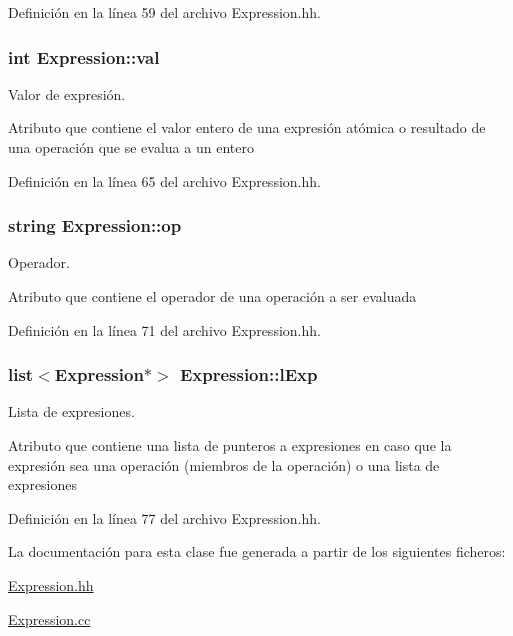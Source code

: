 Definición en la línea 59 del archivo Expression.\+hh.

\subsubsection[{\texorpdfstring{val}{val}}]{\setlength{\rightskip}{0pt plus 5cm}int Expression\+::val\hspace{0.3cm}{\ttfamily [private]}}\hypertarget{class_expression_a9c15b529b5d59e6bffb3855e384c04aa}{}\label{class_expression_a9c15b529b5d59e6bffb3855e384c04aa}


Valor de expresión. 

Atributo que contiene el valor entero de una expresión atómica o resultado de una operación que se evalua a un entero 

Definición en la línea 65 del archivo Expression.\+hh.

\subsubsection[{\texorpdfstring{op}{op}}]{\setlength{\rightskip}{0pt plus 5cm}string Expression\+::op\hspace{0.3cm}{\ttfamily [private]}}\hypertarget{class_expression_a30856695b46075ada151f6f6cdfb9fa8}{}\label{class_expression_a30856695b46075ada151f6f6cdfb9fa8}


Operador. 

Atributo que contiene el operador de una operación a ser evaluada 

Definición en la línea 71 del archivo Expression.\+hh.

\subsubsection[{\texorpdfstring{l\+Exp}{lExp}}]{\setlength{\rightskip}{0pt plus 5cm}list$<${\bf Expression}$\ast$$>$ Expression\+::l\+Exp\hspace{0.3cm}{\ttfamily [private]}}\hypertarget{class_expression_afb4f4617291f7e182cbf2252151b122a}{}\label{class_expression_afb4f4617291f7e182cbf2252151b122a}


Lista de expresiones. 

Atributo que contiene una lista de punteros a expresiones en caso que la expresión sea una operación (miembros de la operación) o una lista de expresiones 

Definición en la línea 77 del archivo Expression.\+hh.



La documentación para esta clase fue generada a partir de los siguientes ficheros\+:\begin{DoxyCompactItemize}
\item 
\hyperlink{_expression_8hh}{Expression.\+hh}\item 
\hyperlink{_expression_8cc}{Expression.\+cc}\end{DoxyCompactItemize}
